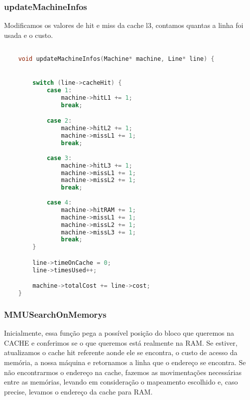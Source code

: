 \documentclass{article}
\begin{document}
\subsubsection{updateMachineInfos}

Modificamos os valores de hit e miss da cache l3, contamos quantas a linha foi usada e o custo.

\begin{lstlisting}[caption={Função updateMachineInfos},label={lst:cod6},language=C]

    void updateMachineInfos(Machine* machine, Line* line) {


        switch (line->cacheHit) {
            case 1:
                machine->hitL1 += 1;
                break;

            case 2:
                machine->hitL2 += 1;
                machine->missL1 += 1;
                break;
            
            case 3:
                machine->hitL3 += 1;
                machine->missL1 += 1;
                machine->missL2 += 1;
                break;
            
            case 4:
                machine->hitRAM += 1;
                machine->missL1 += 1;
                machine->missL2 += 1;
                machine->missL3 += 1;
                break;
        }

        line->timeOnCache = 0;
        line->timesUsed++;

        machine->totalCost += line->cost;
    }   

\end{lstlisting}
\clearpage

\subsubsection{MMUSearchOnMemorys}

Inicialmente, essa função pega a possível posição do bloco que queremos na CACHE e conferimos se o
que queremos está realmente na RAM. Se estiver, atualizamos o cache hit referente aonde ele se encontra,
o custo de acesso da memória, a nossa máquina e retornamos a linha que o endereço se encontra. Se não encontrarmos o 
endereço na cache, fazemos as movimentações necessárias entre as memórias, levando em consideração o mapeamento
escolhido e, caso precise, levamos o endereço da cache para RAM.
\end{document}
